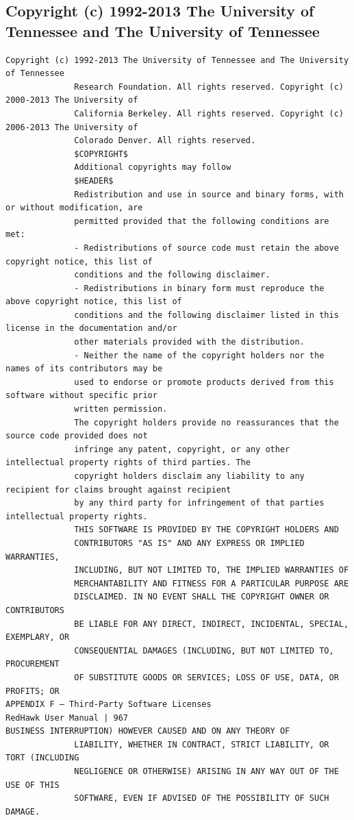 \subsection{Copyright (c) 1992-2013 The University of Tennessee and The University of Tennessee}

\begin{lstlisting}[basicstyle=\ttfamily\scriptsize,breaklines=true]
Copyright (c) 1992-2013 The University of Tennessee and The University of Tennessee
              Research Foundation. All rights reserved. Copyright (c) 2000-2013 The University of
              California Berkeley. All rights reserved. Copyright (c) 2006-2013 The University of
              Colorado Denver. All rights reserved.
              $COPYRIGHT$
              Additional copyrights may follow
              $HEADER$
              Redistribution and use in source and binary forms, with or without modification, are
              permitted provided that the following conditions are met:
              - Redistributions of source code must retain the above copyright notice, this list of
              conditions and the following disclaimer.
              - Redistributions in binary form must reproduce the above copyright notice, this list of
              conditions and the following disclaimer listed in this license in the documentation and/or
              other materials provided with the distribution.
              - Neither the name of the copyright holders nor the names of its contributors may be
              used to endorse or promote products derived from this software without specific prior
              written permission.
              The copyright holders provide no reassurances that the source code provided does not
              infringe any patent, copyright, or any other intellectual property rights of third parties. The
              copyright holders disclaim any liability to any recipient for claims brought against recipient
              by any third party for infringement of that parties intellectual property rights.
              THIS SOFTWARE IS PROVIDED BY THE COPYRIGHT HOLDERS AND
              CONTRIBUTORS "AS IS" AND ANY EXPRESS OR IMPLIED WARRANTIES,
              INCLUDING, BUT NOT LIMITED TO, THE IMPLIED WARRANTIES OF
              MERCHANTABILITY AND FITNESS FOR A PARTICULAR PURPOSE ARE
              DISCLAIMED. IN NO EVENT SHALL THE COPYRIGHT OWNER OR CONTRIBUTORS
              BE LIABLE FOR ANY DIRECT, INDIRECT, INCIDENTAL, SPECIAL, EXEMPLARY, OR
              CONSEQUENTIAL DAMAGES (INCLUDING, BUT NOT LIMITED TO, PROCUREMENT
              OF SUBSTITUTE GOODS OR SERVICES; LOSS OF USE, DATA, OR PROFITS; OR
APPENDIX F — Third-Party Software Licenses                                   RedHawk User Manual | 967
BUSINESS INTERRUPTION) HOWEVER CAUSED AND ON ANY THEORY OF
              LIABILITY, WHETHER IN CONTRACT, STRICT LIABILITY, OR TORT (INCLUDING
              NEGLIGENCE OR OTHERWISE) ARISING IN ANY WAY OUT OF THE USE OF THIS
              SOFTWARE, EVEN IF ADVISED OF THE POSSIBILITY OF SUCH DAMAGE.
\end{lstlisting}

